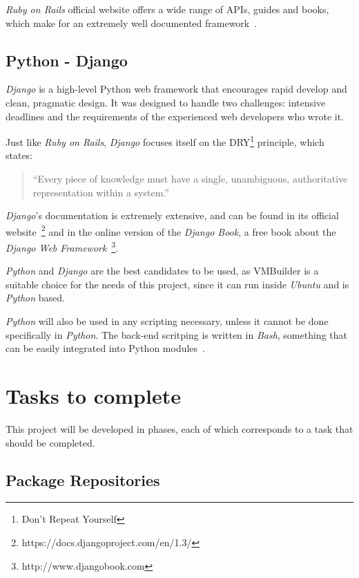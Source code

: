\textit{Ruby on Rails} official website offers a wide range of APIs, guides and books, which make for an extremely well documented framework~\cite{rubyonrails}.

\subsection{Python - Django}\label{tech:python}
\textit{Django} is a high-level Python web framework that encourages rapid develop and clean, pragmatic design. It was designed to handle two challenges: intensive deadlines and the requirements of the experienced web developers who wrote it.

Just like \textit{Ruby on Rails}, \textit{Django} focuses itself on the DRY\footnote{Don't Repeat Yourself} principle, which states:

\begin{quote}
``Every piece of knowledge must have a single, unambiguous, authoritative representation within a system.'' \cite{c2}
\end{quote}

\textit{Django}'s documentation is extremely extensive, and can be found in its official website~\footnote{https://docs.djangoproject.com/en/1.3/} and in the online version of the \textit{Django Book}, a free book about the \textit{Django Web Framework}~\footnote{http://www.djangobook.com}.


\textit{Python} and \textit{Django} are the best candidates to be used, as VMBuilder is a suitable choice for the needs of this project, since it can run inside \textit{Ubuntu} and is \textit{Python} based.

\textit{Python} will also be used in any scripting necessary, unless it cannot be done specifically in \textit{Python}. The back-end scritping is written in \textit{Bash}, something that can be easily integrated into Python modules~\cite{stackoverflow-python-bash}.

\section{Tasks to complete}\label{tasks}

This project will be developed in phases, each of which corresponds to a task that should be completed.

\subsection{Package Repositories}\label{tasks:repo}

